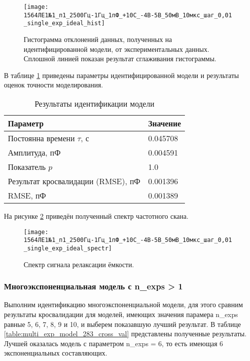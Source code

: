 	\begin{figure}[!htp]
		\centering
		\texttt{[image: 1564ЛЕ1№1\_п1\_2500Гц-1Гц\_1пФ\_+10С\_-4В-5В\_50мВ\_10мкс\_шаг\_0,01\_single\_exp\_ideal\_hist]}
		\caption{Гистограмма отклонений данных, полученных на идентифицированной 
		         модели, от экспериментальных данных. Сплошной линией показан
		         результат сглаживания гистограммы.}
		\label{pic:hist_single_exp_ideal_283}
	\end{figure}

	В таблице \ref{table:results_single_exp_ideal_283} приведены параметры 
	идентифицированной модели и результаты оценок точности моделирования.

	\begin{table}[!htp]
		\centering
		\caption{Результаты идентификации модели}
		\begin{tabular}{|l|l|}
			\hline
			Параметр                           & Значение \\ \hline
			Постоянна времени $\tau$, с        & 0.045708 \\ \hline
			Амплитуда, пФ                      & 0.004591 \\ \hline
			Показатель $p$                     & 1.0      \\ \hline
			Результат кросвалидации (RMSE), пФ & 0.001396 \\ \hline
			RMSE, пФ                           & 0.001389 \\ \hline
		\end{tabular}
		\label{table:results_single_exp_ideal_283}
	\end{table}

	На рисунке \ref{pic:spectr_single_exp_ideal_283} приведён полученный спектр 
	частотного скана.

	\begin{figure}[!htp]
		\centering
		\texttt{[image: 1564ЛЕ1№1\_п1\_2500Гц-1Гц\_1пФ\_+10С\_-4В-5В\_50мВ\_10мкс\_шаг\_0,01\_single\_exp\_ideal\_spectr]}
		\caption{Спектр сигнала релаксации ёмкости.}
		\label{pic:spectr_single_exp_ideal_283}
	\end{figure}


	\newpage
	\subsubsection{Многоэкспоненциальная модель с n\_exps > 1}
	Выполним идентификацию многоэкспоненциальной модели, для этого сравним
	результаты кросвалидации для моделей, имеющих значения парамера n\_exps
	равные 5, 6, 7, 8, 9 и 10, и выберем показавшую лучший результат. В таблице
	\ref{table:multi_exp_model_283_cross_val} представлены полученные результаты.
	Лучшей оказалась модель с параметром n\_exps = 6, то есть имеющая 6 
	экспоненциальных составляющих.

